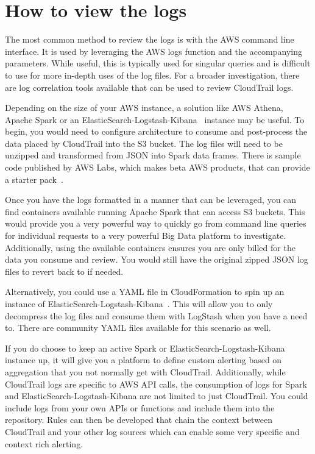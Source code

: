 \section{How to view the logs}

The most common method to review the logs is with the AWS command line
interface. 
It is used by leveraging the AWS logs function and the accompanying parameters.
While useful, this is typically used for singular queries and is difficult to
use for more in-depth uses of the log files. For a broader investigation, there
are log correlation tools available that can be used to review CloudTrail logs.

Depending on the size of your AWS instance, a solution like AWS Athena, Apache 
Spark or an ElasticSearch-Logstash-Kibana~\cite{hid-sp18-518-CloudTrail-ELK} 
instance may be useful. To begin, you would need to configure architecture to 
consume and post-process the data placed by CloudTrail into the S3 bucket. The 
log files will need to be unzipped and transformed from JSON into Spark data 
frames. There is sample code published by AWS Labs, which makes beta AWS 
products, that can provide a starter
pack~\cite{hid-sp18-518-CloudTrail-timely}.

Once you have the logs formatted in a manner that can be leveraged, you can
find containers available running Apache Spark that can access S3 buckets. This
would provide you a very powerful way to quickly go from command line queries
for individual requests to a very powerful Big Data platform to investigate. 
Additionally, using the available containers ensures you are only billed for
the data you consume and review. You would still have the original zipped JSON
log files to revert back to if needed.

Alternatively, you could use a YAML file in CloudFormation to spin up an 
instance of ElasticSearch-Logstash-Kibana~\cite{hid-sp18-518-CloudTrail-ELK}. 
This will allow you to only decompress the log files and consume them with 
LogStash when you have a need to. There are community YAML files available
for this scenario as well.

If you do choose to keep an active Spark or ElasticSearch-Logstash-Kibana
instance up, it will give you a platform to define custom alerting based on
aggregation that you not normally get with CloudTrail. Additionally, while
CloudTrail logs are specific to AWS API calls, the consumption of logs for
Spark and ElasticSearch-Logstash-Kibana are not limited to just CloudTrail.
You could include logs from your own APIs or functions and include them into
the repository. Rules can then be developed that chain the context between 
CloudTrail and your other log sources which can enable some very specific
and context rich alerting.

